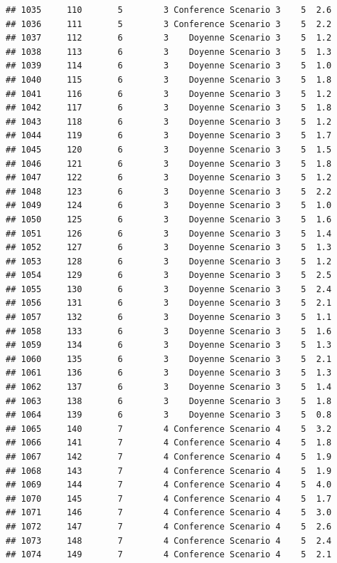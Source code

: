 \documentclass[
]{article}
\begin{document}
\begin{verbatim}
## 1035     110       5        3 Conference Scenario 3    5  2.6
## 1036     111       5        3 Conference Scenario 3    5  2.2
## 1037     112       6        3    Doyenne Scenario 3    5  1.2
## 1038     113       6        3    Doyenne Scenario 3    5  1.3
## 1039     114       6        3    Doyenne Scenario 3    5  1.0
## 1040     115       6        3    Doyenne Scenario 3    5  1.8
## 1041     116       6        3    Doyenne Scenario 3    5  1.2
## 1042     117       6        3    Doyenne Scenario 3    5  1.8
## 1043     118       6        3    Doyenne Scenario 3    5  1.2
## 1044     119       6        3    Doyenne Scenario 3    5  1.7
## 1045     120       6        3    Doyenne Scenario 3    5  1.5
## 1046     121       6        3    Doyenne Scenario 3    5  1.8
## 1047     122       6        3    Doyenne Scenario 3    5  1.2
## 1048     123       6        3    Doyenne Scenario 3    5  2.2
## 1049     124       6        3    Doyenne Scenario 3    5  1.0
## 1050     125       6        3    Doyenne Scenario 3    5  1.6
## 1051     126       6        3    Doyenne Scenario 3    5  1.4
## 1052     127       6        3    Doyenne Scenario 3    5  1.3
## 1053     128       6        3    Doyenne Scenario 3    5  1.2
## 1054     129       6        3    Doyenne Scenario 3    5  2.5
## 1055     130       6        3    Doyenne Scenario 3    5  2.4
## 1056     131       6        3    Doyenne Scenario 3    5  2.1
## 1057     132       6        3    Doyenne Scenario 3    5  1.1
## 1058     133       6        3    Doyenne Scenario 3    5  1.6
## 1059     134       6        3    Doyenne Scenario 3    5  1.3
## 1060     135       6        3    Doyenne Scenario 3    5  2.1
## 1061     136       6        3    Doyenne Scenario 3    5  1.3
## 1062     137       6        3    Doyenne Scenario 3    5  1.4
## 1063     138       6        3    Doyenne Scenario 3    5  1.8
## 1064     139       6        3    Doyenne Scenario 3    5  0.8
## 1065     140       7        4 Conference Scenario 4    5  3.2
## 1066     141       7        4 Conference Scenario 4    5  1.8
## 1067     142       7        4 Conference Scenario 4    5  1.9
## 1068     143       7        4 Conference Scenario 4    5  1.9
## 1069     144       7        4 Conference Scenario 4    5  4.0
## 1070     145       7        4 Conference Scenario 4    5  1.7
## 1071     146       7        4 Conference Scenario 4    5  3.0
## 1072     147       7        4 Conference Scenario 4    5  2.6
## 1073     148       7        4 Conference Scenario 4    5  2.4
## 1074     149       7        4 Conference Scenario 4    5  2.1

\end{verbatim}
\end{document}

